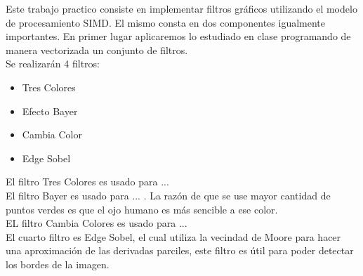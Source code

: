 Este trabajo practico consiste en implementar filtros gráficos utilizando el modelo de procesamiento SIMD. 
El mismo consta en dos componentes igualmente importantes. En primer lugar aplicaremos lo estudiado en clase programando de manera vectorizada un conjunto de filtros.\\
Se realizarán 4 filtros:\\
\begin{itemize}
    \item Tres Colores
    \item Efecto Bayer
    \item Cambia Color
    \item Edge Sobel
\end{itemize}
El filtro Tres Colores es usado para ...\\
El filtro Bayer es usado para ... . La razón de que se use mayor cantidad de puntos verdes es que el ojo humano es más sencible a ese color.\\
EL filtro Cambia Colores es usado para ...\\
El cuarto filtro es Edge Sobel, el cual utiliza la vecindad de Moore para hacer una aproximaci\'on de las derivadas parciles, este filtro es \'util para poder detectar los bordes de la imagen.\\
